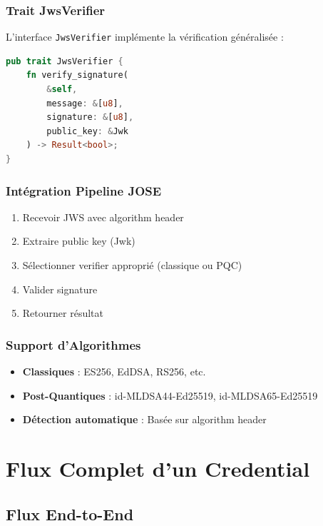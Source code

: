 \documentclass[12pt,a4paper]{report}
\begin{document}
\subsection{Trait JwsVerifier}

L'interface \texttt{JwsVerifier} implémente la vérification généralisée :

\begin{lstlisting}[language=Rust]
pub trait JwsVerifier {
    fn verify_signature(
        &self,
        message: &[u8],
        signature: &[u8],
        public_key: &Jwk
    ) -> Result<bool>;
}
\end{lstlisting}

\subsection{Intégration Pipeline JOSE}

\begin{enumerate}
  \item Recevoir JWS avec algorithm header
  \item Extraire public key (Jwk)
  \item Sélectionner verifier approprié (classique ou PQC)
  \item Valider signature
  \item Retourner résultat
\end{enumerate}

\subsection{Support d'Algorithmes}

\begin{itemize}
  \item \textbf{Classiques} : ES256, EdDSA, RS256, etc.
  \item \textbf{Post-Quantiques} : id-MLDSA44-Ed25519, id-MLDSA65-Ed25519
  \item \textbf{Détection automatique} : Basée sur algorithm header
\end{itemize}

\chapter{Flux Complet d'un Credential}

\section{Flux End-to-End}
\end{document}
